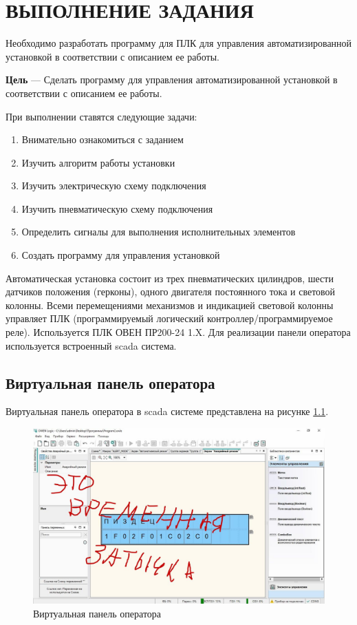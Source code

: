\chapter{ВЫПОЛНЕНИЕ ЗАДАНИЯ}
Необходимо разработать программу для ПЛК для управления автоматизированной
установкой в соответствии с описанием ее работы.

\textbf{Цель} --- Сделать программу для управления автоматизированной установкой в соответствии с описанием ее работы.

При выполнении ставятся следующие задачи:
\begin{enumerate}
    \item Внимательно ознакомиться с заданием
    \item Изучить алгоритм работы установки
    \item Изучить электрическую схему подключения
    \item Изучить пневматическую схему подключения
    \item Определить сигналы для выполнения исполнительных элементов
    \item Создать программу для управления установкой
\end{enumerate}

Автоматическая установка состоит из трех пневматических цилиндров, шести
датчиков положения (герконы), одного двигателя постоянного тока и световой
колонны. Всеми перемещениями механизмов и индикацией световой колонны
управляет ПЛК (программируемый логический контроллер/программируемое
реле). Используется ПЛК ОВЕН ПР200-24 1.X.
Для реализации панели оператора используется встроенный scada система.

\section{Виртуальная панель оператора}
Виртуальная панель оператора в scada системе представлена на рисунке \ref{fig:scada_panel}.
\begin{figure}[hb]
    \centering
    \includegraphics[scale=0.30]{fig/4.1.jpg}
    \caption{Виртуальная панель оператора}
    \label{fig:scada_panel}
\end{figure}

